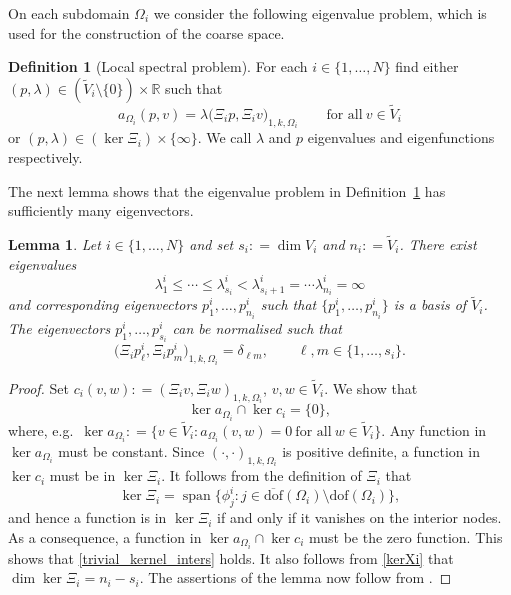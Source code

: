 \documentclass[preprint,3p,times]{elsarticle}
\newcommand{\assign}{\mathrel{\mathop:}=}
\newtheorem{lemma}[theorem]{Lemma}
\theoremstyle{definition}
\newtheorem{definition}[theorem]{Definition}
\numberwithin{equation}{section}
\begin{document}
On each subdomain $\Omega_i$ we consider the following eigenvalue problem, which is used for 
the construction of the coarse space.

\begin{definition}[Local spectral problem]\label{def:DeltaGenEO}
For each $i\in\{1,\ldots,N\}$ find either $(p,\lambda)\in(\widetilde{V}_i\setminus\{0\})\times\mathbb{R}$
such that
\[
	a_{\Omega_i}(p,v) = \lambda\bigl(\Xi_i p,\Xi_i v\bigr)_{1,k,\Omega_i}
	\qquad\text{for all} \ v\in\widetilde{V}_i
\]
or $(p,\lambda)\in(\ker\Xi_i)\times\{\infty\}$.
We call $\lambda$ and $p$ eigenvalues and eigenfunctions respectively.
\end{definition}

The next lemma shows that the eigenvalue problem in Definition~\ref{def:DeltaGenEO} has sufficiently many eigenvectors.

\begin{lemma}\label{lem:eigenvectors}
Let $i\in\{1,\ldots,N\}$ and set $s_i\assign\dim V_i$ and $n_i\assign\widetilde{V}_i$.
There exist eigenvalues
\begin{equation}\label{order_eigenvalues}
	\lambda_1^i \le \cdots \le \lambda_{s_i}^i < \lambda_{s_i+1}^i = \cdots \lambda_{n_i}^i = \infty
\end{equation}
and corresponding eigenvectors $p_1^i,\ldots,p_{n_i}^i$ 
such that $\{p_1^i,\ldots,p_{n_i}^i\}$ is a basis of $\widetilde{V}_i$.
The eigenvectors $p_1^i,\ldots,p_{s_i}^i$ can be normalised such that
\begin{equation}\label{eigvec_norm}
	\bigl(\Xi_i p_\ell^i,\Xi_i p_m^i\bigr)_{{1,k,\Omega_i}} = \delta_{\ell m}, \qquad \ell,m\in\{1,\ldots,s_i\}.
\end{equation}
\end{lemma}

\begin{proof}
Set $c_i(v,w)\assign(\Xi_i v,\Xi_i w)_{1,k,\Omega_i}$, $v,w\in\widetilde{V}_i$.
We show that
\begin{equation}\label{trivial_kernel_inters}
	\ker a_{\Omega_i} \cap \ker c_i = \{0\},
\end{equation}
where, e.g.\ $\ker a_{\Omega_i}\assign\{v\in\widetilde{V}_i:a_{\Omega_i}(v,w)=0 \ \text{for all} \ w\in\widetilde{V}_i\}$.
Any function in $\ker a_{\Omega_i}$ must be constant.
Since $(\cdot,\cdot)_{1,k,\Omega_i}$ is positive definite, a function in $\ker c_i$ must be in $\ker\Xi_i$.
It follows from the definition of $\Xi_i$ that
\begin{equation}\label{kerXi}
	\ker\Xi_i = \operatorname{span}\{\phi_j^i:j\in\overline{\mathrm{dof}}(\Omega_i)\setminus\mathrm{dof}(\Omega_i)\},
\end{equation}
and hence a function is in $\ker\Xi_i$ if and only if it vanishes on the interior nodes.
As a consequence, a function in $\ker a_{\Omega_i}\cap\ker c_i$ must be the zero function.
This shows that \eqref{trivial_kernel_inters} holds.
It also follows from \eqref{kerXi} that $\dim\ker\Xi_i=n_i-s_i$.
The assertions of the lemma now follow from \cite[Lemma~3.14]{Bastian:2023:MSDD}.
\end{proof}
\end{document}
